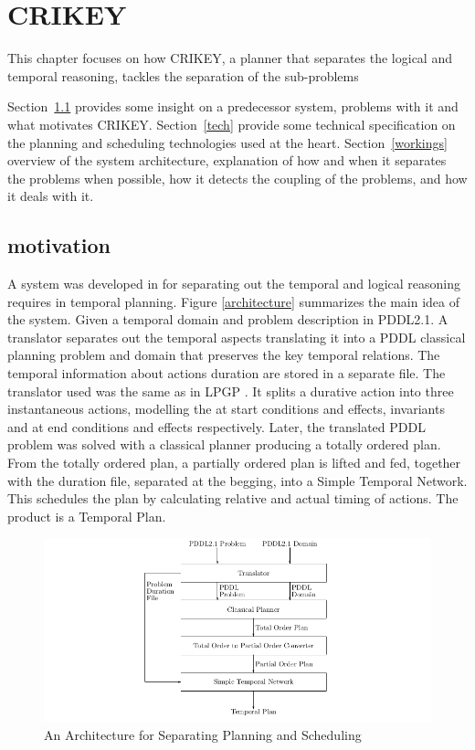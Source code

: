 \documentclass
[a4paper
,english
,parskip=half
,bibliography=totoc
]{scrreprt}
\begin{document}
\chapter{CRIKEY} \label{crikey}
   This chapter focuses on how CRIKEY, a planner that separates the logical and temporal reasoning, tackles the separation of the sub-problems 

    Section~\ref{motivation} provides some insight on a predecessor system, problems with it and what motivates CRIKEY.
    Section~\ref{tech} provide some technical specification on the planning and scheduling technologies used at the heart.
    Section~\ref{workings} overview of the system architecture, explanation of how and when it separates the problems when possible, how it detects the coupling of the problems, and how it deals with it.
    
    \section{motivation} \label{motivation}
    A system was developed in \citep{Halsey2003TemporalPW} for separating out the temporal and logical reasoning requires in temporal planning. Figure \ref{architecture} summarizes the main idea of the system. Given a temporal domain and problem description in PDDL2.1. A translator separates out the temporal aspects translating it into a PDDL classical planning problem and domain that preserves the key temporal relations. 
    The temporal information about actions duration are stored in a separate file. The translator used was the same as in LPGP \citep{Long:2003:EGF:3036969.3036977}. It splits a durative action into three instantaneous actions, modelling the at start conditions and effects, invariants and at end conditions and effects respectively. Later, the translated PDDL problem was solved with a classical planner producing a totally ordered plan.
    From the totally ordered plan, a partially ordered plan is lifted and fed, together with the duration file, separated at the begging, into a Simple Temporal Network. This schedules the plan by calculating relative and actual timing of actions. The product is a Temporal Plan.

    \begin{figure}[h]
        \centering    
        \includegraphics[width=15cm]{architecture.png}
        \caption{An Architecture for Separating Planning and Scheduling}
         \label{fig:architecture}
    \end{figure}
    
\end{document}
